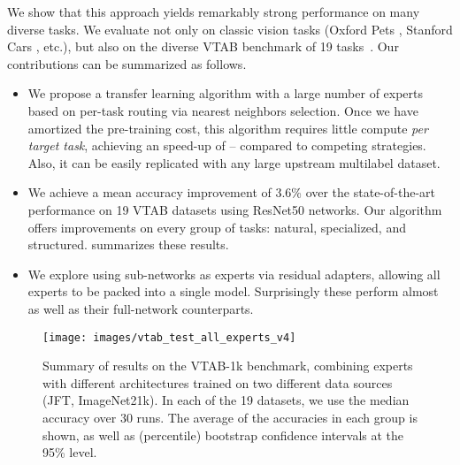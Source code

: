 \documentclass{article}
\begin{document}
We show that this approach yields remarkably strong performance on many diverse tasks.
We evaluate not only on classic vision tasks (Oxford Pets \cite{parkhi12a}, Stanford Cars \cite{KrauseStarkDengFei-Fei_3DRR2013}, etc.), but also on the diverse VTAB benchmark of 19 tasks~\cite{zhai2019visual}.
Our contributions can be summarized as follows.
\begin{itemize}[leftmargin=*]
     \item We propose a 
     transfer learning algorithm with a large number of experts based on per-task routing via nearest neighbors selection.
     Once we have amortized the pre-training cost, this algorithm requires little compute \emph{per target task},
     achieving an speed-up of -- compared to competing strategies.
     Also, it can be easily replicated with any large upstream multilabel dataset.
     \item We achieve a mean accuracy improvement of 3.6\% over the
     state-of-the-art performance on 19 VTAB datasets using ResNet50 networks.
     Our algorithm offers improvements on every group of tasks: natural, specialized, and structured.  summarizes
     these results.
     \item We explore using sub-networks as experts via residual adapters, allowing all experts to be packed into a single model.
     Surprisingly these perform almost as well as their full-network counterparts.
\end{itemize}

\begin{figure}[htb]
\centering
\texttt{[image: images/vtab\_test\_all\_experts\_v4]}
\caption{Summary of results on the VTAB-1k benchmark, combining experts 
with different architectures trained on two different data sources (JFT, ImageNet21k). In each of the 19 datasets, we use the median accuracy over
30 runs.
The average of the accuracies in each group is shown, as well as (percentile) bootstrap confidence intervals at the 95\% level.
\label{fig:vtab_test_all_experts}}
\vspace{-1em}
\end{figure}
\end{document}
